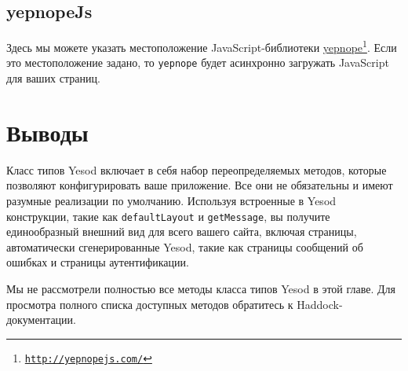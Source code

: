 \subsection {yepnopeJs}
Здесь мы можете указать местоположение JavaScript-библиотеки
\href{http://yepnopejs.com/}{yepnope}\footnote{\href{http://yepnopejs.com/}{\texttt{http://yepnopejs.com/}}}.
Если это местоположение задано, то \lstinline!yepnope! будет асинхронно
загружать JavaScript для ваших страниц.

\section {Выводы}

Класс типов Yesod включает в себя набор переопределяемых методов, которые
позволяют конфигурировать ваше приложение. Все они не обязательны и имеют
разумные реализации по умолчанию. Используя встроенные в Yesod конструкции,
такие как \lstinline!defaultLayout! и \lstinline!getMessage!, вы получите
единообразный внешний вид для всего вашего сайта, включая страницы,
автоматически сгенерированные Yesod, такие как страницы сообщений об ошибках и
страницы аутентификации.

Мы не рассмотрели полностью все методы класса типов Yesod в этой главе. Для
просмотра полного списка доступных методов обратитесь к Haddock-документации.
